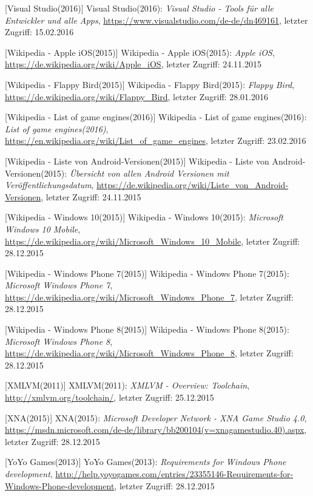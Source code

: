 \begin{thebibliography}{}
[Visual Studio(2016)] Visual Studio(2016): \emph{Visual Studio - Tools für alle Entwickler und alle Apps},
\url{https://www.visualstudio.com/de-de/dn469161}, letzter Zugriff: 15.02.2016

[Wikipedia - Apple iOS(2015)] Wikipedia - Apple iOS(2015): \emph{Apple iOS},
\url{https://de.wikipedia.org/wiki/Apple_iOS}, letzter Zugriff: 24.11.2015

[Wikipedia - Flappy Bird(2015)] Wikipedia - Flappy Bird(2015): \emph{Flappy Bird},
\url{https://de.wikipedia.org/wiki/Flappy_Bird}, letzter Zugriff: 28.01.2016

[Wikipedia - List of game engines(2016)] Wikipedia - List of game engines(2016): \emph{List of game engines(2016)},
\url{https://en.wikipedia.org/wiki/List_of_game_engines}, letzter Zugriff: 23.02.2016

[Wikipedia - Liste von Android-Versionen(2015)] Wikipedia - Liste von Android-Versionen(2015): \emph{Übersicht von allen Android Versionen mit Veröffentlichungsdatum},
\url{https://de.wikipedia.org/wiki/Liste_von_Android-Versionen}, letzter Zugriff: 24.11.2015

[Wikipedia - Windows 10(2015)] Wikipedia - Windows 10(2015): \emph{Microsoft Windows 10 Mobile},
\url{https://de.wikipedia.org/wiki/Microsoft_Windows_10_Mobile}, letzter Zugriff: 28.12.2015

[Wikipedia - Windows Phone 7(2015)] Wikipedia - Windows Phone 7(2015): \emph{Microsoft Windows Phone 7},
\url{https://de.wikipedia.org/wiki/Microsoft_Windows_Phone_7}, letzter Zugriff: 28.12.2015

[Wikipedia - Windows Phone 8(2015)] Wikipedia - Windows Phone 8(2015): \emph{Microsoft Windows Phone 8},
\url{https://de.wikipedia.org/wiki/Microsoft_Windows_Phone_8}, letzter Zugriff: 28.12.2015

[XMLVM(2011)] XMLVM(2011): \emph{XMLVM - Overview: Toolchain},
\url{http://xmlvm.org/toolchain/}, letzter Zugriff: 25.12.2015

[XNA(2015)] XNA(2015): \emph{Microsoft Developer Network - XNA Game Studio 4.0},
\url{https://msdn.microsoft.com/de-de/library/bb200104(v=xnagamestudio.40).aspx}, letzter Zugriff: 28.12.2015

[YoYo Games(2013)] YoYo Games(2013): \emph{Requirements for Windows Phone development},
\url{http://help.yoyogames.com/entries/23355146-Requirements-for-Windows-Phone-development}, letzter Zugriff: 28.12.2015


\end{thebibliography}
\clearpage\thispagestyle{empty}
\eigen  %
